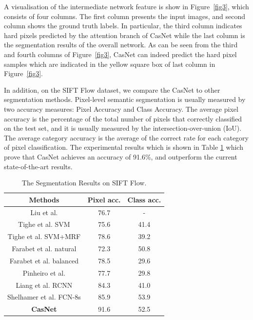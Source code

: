 \documentclass[10.5pt,compsoc]{TsT}
\newcommand{\upcite}[1]{\superscript{\textsuperscript{\cite{#1}}}}
\theoremstyle{mystyle}
\newcommand{\upcite}[1]{\textsuperscript{\cite{#1}}}
\begin{document}
{A visualisation of the intermediate network feature is show in Figure~\ref{fig3}, which consists of four columns. The first column presents the input images, and second column shows the ground truth labels. In particular, the third column indicates hard pixels predicted by the attention branch of CasNet while the last column is the segmentation results of the overall network. As can be seen from the third and fourth columns of Figure~\ref{fig3}, CasNet can indeed predict the hard pixel samples which are indicated in the yellow square box of last column in Figure~\ref{fig3}.

In addition, on the SIFT Flow dataset, we compare the CasNet to other segmentation methods. Pixel-level semantic segmentation is usually measured by two accuracy measures: Pixel Accuracy and Class Accuracy. The average pixel accuracy is the percentage of the total number of pixels that correctly classified on the test set, and it is usually measured by the intersection-over-union (IoU). The average category accuracy is the average of the correct rate for each category of pixel classification. The experimental results which is shown in Table \ref{table1} which prove that CasNet achieves an accuracy of 91.6\%, and outperform the current state-of-the-art results.

\begin{table}[h]
\large
\setlength{\belowcaptionskip}{12pt}
\caption{The Segmentation Results on SIFT Flow.}
\label{table1}
\centering
\begin{tabular}{ccc}
\hline 
Methods & Pixel acc. & Class acc. \\
\hline
Liu et al.\upcite{6} & 76.7 & - \\
Tighe et al. SVM\upcite{25} & 75.6 & 41.4 \\
Tighe et al. SVM+MRF\upcite{26} & 78.6 & 39.2 \\
Farabet et al. natural\upcite{11} & 72.3 & 50.8 \\
Farabet et al. balanced\upcite{11} & 78.5 & 29.6 \\
Pinheiro et al.\upcite{13} & 77.7 & 29.8 \\
Liang et al. RCNN\upcite{24} & 84.3 & 41.0 \\
Shelhamer et al. FCN-8s\upcite{4} & 85.9 & 53.9 \\
\textbf{CasNet} & 91.6 & 52.5 \\

\hline
\end{tabular}
\end{table}

}
\end{document}
